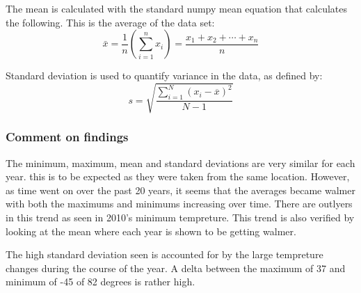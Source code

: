 \documentclass[11pt]{article}
\begin{document}
The mean is calculated with the standard numpy mean equation that
calculates the following. This is the average of the data set:
\[\bar{x} = \frac{1}{n}\left (\sum_{i=1}^n{x_i}\right ) = \frac{x_1+x_2+\cdots +x_n}{n}\]

Standard deviation is used to quantify variance in the data, as defined
by: \[s = \sqrt{\frac{\sum_{i=1}^N (x_i - \overline{x})^2}{N-1} }\]

\subsubsection{Comment on findings}\label{comment-on-findings}

The minimum, maximum, mean and standard deviations are very similar for
each year. this is to be expected as they were taken from the same
location. However, as time went on over the past 20 years, it seems that
the averages became walmer with both the maximums and minimums
increasing over time. There are outlyers in this trend as seen in 2010's
minimum tempreture. This trend is also verified by looking at the mean
where each year is shown to be getting walmer.

The high standard deviation seen is accounted for by the large
tempreture changes during the course of the year. A delta between the
maximum of 37 and minimum of -45 of 82 degrees is rather high.
\end{document}
